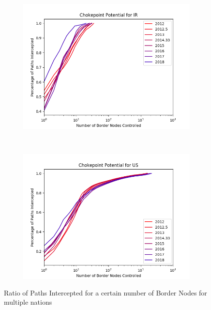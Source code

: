 \documentclass{article}
\begin{document}
\begin{multicols}{2}
\begin{figure}
\begin{subfigure}[b]{0.4\linewidth}
	\end{subfigure}
	\begin{subfigure}[b]{0.4\linewidth}
		\includegraphics[width=\linewidth]{single_IR}
	\end{subfigure}
	\\
	\begin{subfigure}[b]{0.4\linewidth}
		\includegraphics[width=\linewidth]{single_US}
	\end{subfigure}


	\caption{Ratio of Paths Intercepted for a certain number of Border Nodes for multiple nations}\label{fig:chokepoint}
\end{figure}


\end{multicols}
\end{document}
